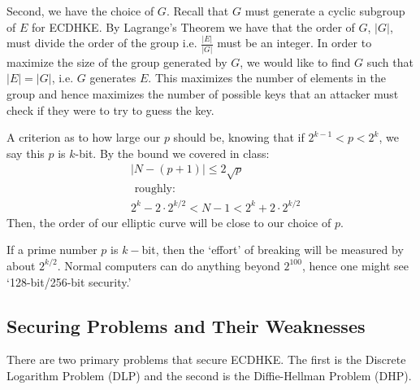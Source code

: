 \documentclass{article}
\theoremstyle{plain}
\theoremstyle{definition}
\newcommand{\abs}[1]{\lvert #1 \rvert}
\begin{document}
                Second, we have the choice of $G$.
                Recall that $G$ must generate a cyclic subgroup of $E$ for ECDHKE.
                By Lagrange's Theorem we have that the order of $G$, $\abs{G}$, must divide the order of the group i.e. $\frac{\abs{E}}{\abs{G}}$ must be an integer.
                In order to maximize the size of the group generated by $G$, we would like to find $G$ such that $\abs{E} = \abs{G}$, i.e. $G$ generates $E$.
                This maximizes the number of elements in the group and hence maximizes the number of possible keys that an attacker must check if they were to try to guess the key.

                A criterion as to how large our $p$ should be, knowing that if $ 2^{k-1}< p < 2^k$, we say this $p$ is $k$-bit. By the bound we covered in class:
\begin{align*}
    &|N - (p+1)| \leq 2\sqrt{p}\\
&\text{ roughly:}\\
    &2^k -2\cdot 2^{k/2} < N -1  < 2^k + 2\cdot 2^{k/2}
\end{align*}
Then, the order of our elliptic curve will be close to our choice of $p$.

If a prime number $p$ is $k-$bit, then the `effort' of breaking will be measured by about $2^{k/2}$. Normal computers can do anything beyond $2^{100}$, hence one might see `128-bit/256-bit security.'

        \subsection{Securing Problems and Their Weaknesses}\label{problems}
                
                There are two primary problems that secure ECDHKE.
                The first is the Discrete Logarithm Problem (DLP) and the second is the Diffie-Hellman Problem (DHP).
                
\end{document}

